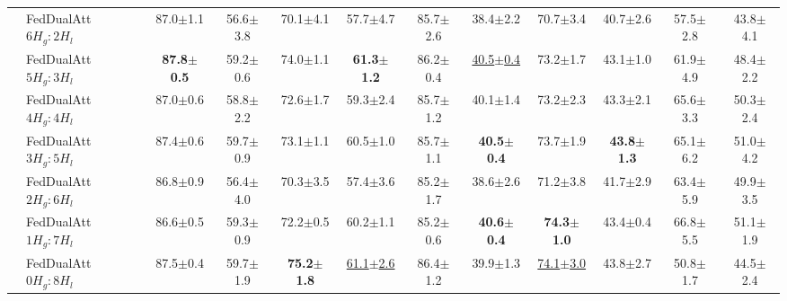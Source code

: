 \documentclass[conference]{IEEEtran}
\begin{document}
{\begin{table}[!t]
\begin{tabular}{|c|l|cc|cc|cc|cc|cc|}
    & FedDualAtt $6H_g\!:\!2H_l$ & 87.0{\scriptsize$\pm$1.1} & 56.6{\scriptsize$\pm$3.8} & 70.1{\scriptsize$\pm$4.1} & 57.7{\scriptsize$\pm$4.7} & 85.7{\scriptsize$\pm$2.6} & 38.4{\scriptsize$\pm$2.2} & 70.7{\scriptsize$\pm$3.4} & 40.7{\scriptsize$\pm$2.6} & 57.5{\scriptsize$\pm$2.8} & 43.8{\scriptsize$\pm$4.1} \\
    & FedDualAtt $5H_g\!:\!3H_l$ & \textbf{87.8{\scriptsize$\pm$0.5}} & 59.2{\scriptsize$\pm$0.6} & 74.0{\scriptsize$\pm$1.1} & \textbf{61.3{\scriptsize$\pm$1.2}} & 86.2{\scriptsize$\pm$0.4} & \underline{40.5{\scriptsize$\pm$0.4}} & 73.2{\scriptsize$\pm$1.7} & 43.1{\scriptsize$\pm$1.0} & 61.9{\scriptsize$\pm$4.9} & 48.4{\scriptsize$\pm$2.2} \\
    & FedDualAtt $4H_g\!:\!4H_l$ & 87.0{\scriptsize$\pm$0.6} & 58.8{\scriptsize$\pm$2.2} & 72.6{\scriptsize$\pm$1.7} & 59.3{\scriptsize$\pm$2.4} & 85.7{\scriptsize$\pm$1.2} & 40.1{\scriptsize$\pm$1.4} & 73.2{\scriptsize$\pm$2.3} & 43.3{\scriptsize$\pm$2.1} & 65.6{\scriptsize$\pm$3.3} & 50.3{\scriptsize$\pm$2.4} \\
    & FedDualAtt $3H_g\!:\!5H_l$ & 87.4{\scriptsize$\pm$0.6} & 59.7{\scriptsize$\pm$0.9} & 73.1{\scriptsize$\pm$1.1} & 60.5{\scriptsize$\pm$1.0} & 85.7{\scriptsize$\pm$1.1} & \textbf{40.5{\scriptsize$\pm$0.4}} & 73.7{\scriptsize$\pm$1.9} & \textbf{43.8{\scriptsize$\pm$1.3}} & 65.1{\scriptsize$\pm$6.2} & 51.0{\scriptsize$\pm$4.2} \\
    & FedDualAtt $2H_g\!:\!6H_l$ & 86.8{\scriptsize$\pm$0.9} & 56.4{\scriptsize$\pm$4.0} & 70.3{\scriptsize$\pm$3.5} & 57.4{\scriptsize$\pm$3.6} & 85.2{\scriptsize$\pm$1.7} & 38.6{\scriptsize$\pm$2.6} & 71.2{\scriptsize$\pm$3.8} & 41.7{\scriptsize$\pm$2.9} & 63.4{\scriptsize$\pm$5.9} & 49.9{\scriptsize$\pm$3.5} \\
    & FedDualAtt $1H_g\!:\!7H_l$ & 86.6{\scriptsize$\pm$0.5} & 59.3{\scriptsize$\pm$0.9} & 72.2{\scriptsize$\pm$0.5} & 60.2{\scriptsize$\pm$1.1} & 85.2{\scriptsize$\pm$0.6} & \textbf{40.6{\scriptsize$\pm$0.4}} & \textbf{74.3{\scriptsize$\pm$1.0}} & 43.4{\scriptsize$\pm$0.4} & 66.8{\scriptsize$\pm$5.5} & 51.1{\scriptsize$\pm$1.9} \\
    & FedDualAtt $0H_g\!:\!8H_l$ & 87.5{\scriptsize$\pm$0.4} & 59.7{\scriptsize$\pm$1.9} & \textbf{75.2{\scriptsize$\pm$1.8}} & \underline{61.1{\scriptsize$\pm$2.6}} & 86.4{\scriptsize$\pm$1.2} & 39.9{\scriptsize$\pm$1.3} & \underline{74.1{\scriptsize$\pm$3.0}} & 43.8{\scriptsize$\pm$2.7} & 50.8{\scriptsize$\pm$1.7} & 44.5{\scriptsize$\pm$2.4} \\
    \hline
  \end{tabular}
\end{table}

}
\end{document}
